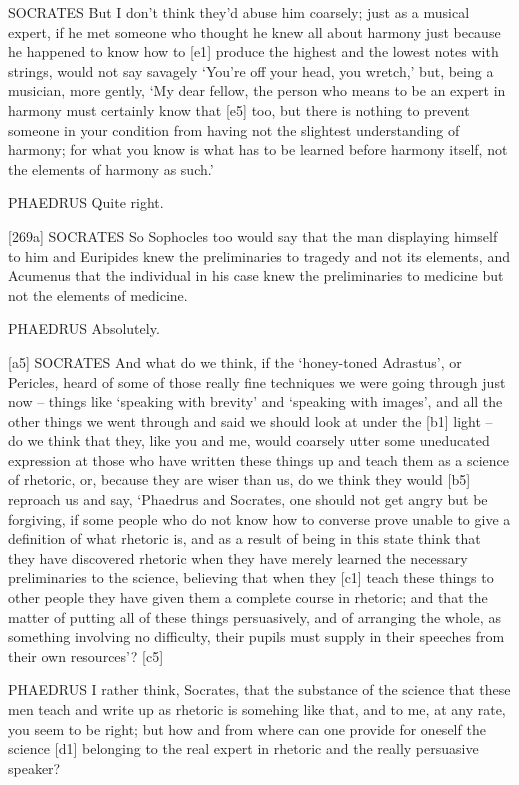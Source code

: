 SOCRATES But I don't think they'd abuse him coarsely; just as a musical
expert, if he met someone who thought he knew all about harmony just
because he happened to know how to {[}e1{]} produce the highest and the
lowest notes with strings, would not say savagely ‘You're off your head,
you wretch,' but, being a musician, more gently, ‘My dear fellow, the
person who means to be an expert in harmony must certainly know that
{[}e5{]} too, but there is nothing to prevent someone in your condition
from having not the slightest understanding of harmony; for what you
know is what has to be learned before harmony itself, not the elements
of harmony as such.'

PHAEDRUS Quite right.

{[}269a{]} SOCRATES So Sophocles too would say that the man displaying
himself to him and Euripides knew the preliminaries to tragedy and not
its elements, and Acumenus that the individual in his case knew the
preliminaries to medicine but not the elements of medicine.

PHAEDRUS Absolutely.

{[}a5{]} SOCRATES And what do we think, if the ‘honey-toned Adrastus',
or Pericles, heard of
some of those really fine techniques we were going through just now --
things like ‘speaking with brevity' and ‘speaking with images', and all
the other things we went through and said we should look at under the
{[}b1{]} light -- do we think that they, like you and me, would coarsely
utter some uneducated expression at those who have written these things
up and teach them as a science of rhetoric, or, because they are wiser
than us, do we think they would {[}b5{]} reproach us and say, ‘Phaedrus
and Socrates, one should not get angry but be forgiving, if some people
who do not know how to
converse prove unable to
give a definition of what rhetoric is, and as a result of being in this
state think that they have discovered rhetoric when they have merely
learned the necessary preliminaries to the science, believing that when
they {[}c1{]} teach these things to other people they have given them a
complete course in rhetoric; and that the matter of putting all of these
things persuasively, and of arranging the whole, as something involving
no difficulty, their pupils must supply in their speeches from their own
resources'? {[}c5{]}

PHAEDRUS I rather think, Socrates, that the substance of the science
that these men teach and write up as rhetoric is somehing like that, and
to me, at any rate, you seem to be right; but how and from where can one
provide for oneself the science {[}d1{]} belonging to the real expert in
rhetoric and the really persuasive speaker?

